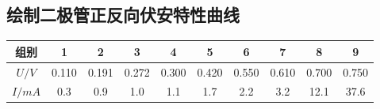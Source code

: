 \documentclass[UTF8]{ctexart}
\begin{document}
\subsection{绘制二极管正反向伏安特性曲线}
\begin{table}[H]
    \centering
    \begin{tabular}{|c|c|c|c|c|c|c|c|c|c|}
    \hline
      组别   & 1 & 2 & 3 & 4 & 5 & 6 & 7  & 8 & 9 \\
    \hline
       $U/V$  &  0.110  &  0.191  &   0.272  &  0.300  &  0.420 &  0.550  &  0.610  &  0.700  &  0.750          \\
    \hline
       $I/mA$ & 0.3  &  0.9   &  1.0  &  1.1  &  1.7  &  2.2  & 3.2  &  12.1  &  37.6   \\
    \hline
    \end{tabular}
\end{table}
\end{document}
